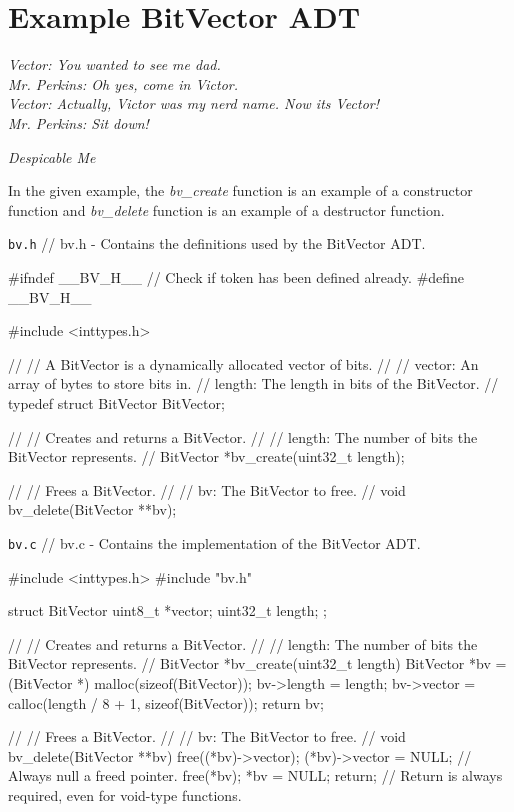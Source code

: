 \documentclass[11pt]{article}
\begin{document}
\section{Example BitVector ADT}

\textwidth
\epigraph{\emph{
Vector: You wanted to see me dad. \\
Mr. Perkins: Oh yes, come in Victor. \\
Vector: Actually, Victor was my nerd name.  Now its Vector! \\
Mr. Perkins: Sit down!
}}{\emph{Despicable Me}}

\noindent In the given example, the \emph{bv\_create} function is an example of a constructor function and
 \emph{bv\_delete} function is an example of a destructor function.

\begin{codelisting}{\texttt{bv.h}}
// bv.h - Contains the definitions used by the BitVector ADT.

#ifndef __BV_H__ // Check if token has been defined already.
#define __BV_H__

#include <inttypes.h>

//
// A BitVector is a dynamically allocated vector of bits.
//
// vector: An array of bytes to store bits in.
// length: The length in bits of the BitVector.
//
typedef struct BitVector BitVector;

//
// Creates and returns a BitVector.
//
// length: The number of bits the BitVector represents.
//
BitVector *bv_create(uint32_t length);

//
// Frees a BitVector.
//
// bv: The BitVector to free.
//
void bv_delete(BitVector **bv);
\end{codelisting}

\begin{codelisting}{\texttt{bv.c}}
// bv.c - Contains the implementation of the BitVector ADT.

#include <inttypes.h>
#include "bv.h"

struct BitVector {
    uint8_t *vector;
    uint32_t length;
};

//
// Creates and returns a BitVector.
//
// length: The number of bits the BitVector represents.
//
BitVector *bv_create(uint32_t length) {
    BitVector *bv = (BitVector *) malloc(sizeof(BitVector));
    bv->length = length;
    bv->vector = calloc(length / 8 + 1, sizeof(BitVector));
    return bv;
}

//
// Frees a BitVector.
//
// bv: The BitVector to free.
//
void bv_delete(BitVector **bv) {
    free((*bv)->vector);
    (*bv)->vector = NULL; // Always null a freed pointer.
    free(*bv);
    *bv = NULL;
    return; // Return is always required, even for void-type functions.
}
\end{codelisting}
\end{document}

